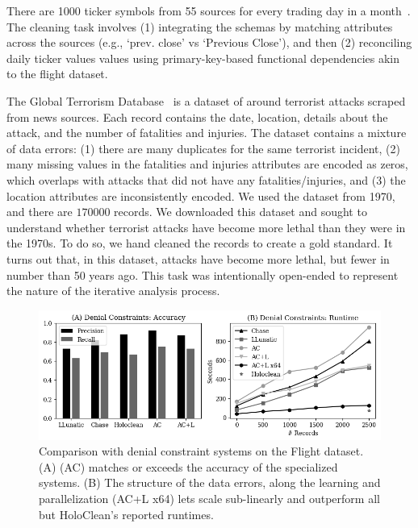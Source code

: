 
 There are 1000 ticker symbols from 55 sources for every trading day in a month~\cite{data-flights}.  The cleaning task involves (1) integrating the schemas by matching attributes across the sources (e.g., `prev. close' vs `Previous Close'), and then (2) reconciling daily ticker values values using primary-key-based functional dependencies akin to the flight dataset.

 The Global Terrorism Database~\cite{data-terrorism} is a dataset of around terrorist attacks scraped from news sources.  Each record contains the date, location, details about the attack, and the number of fatalities and injuries.  The dataset contains a mixture of data errors:
(1) there are many duplicates for the same terrorist incident,
(2) many missing values in the fatalities and injuries attributes are encoded as zeros, which overlaps with attacks that did not have any fatalities/injuries, and
(3) the location attributes are inconsistently encoded.  
We used the dataset from 1970, and there are $170000$ records.  
We downloaded this dataset and sought to understand whether terrorist attacks have become more lethal than they were in the 1970s.  To do so, we hand cleaned the records to create a gold standard.  It turns out that, in this dataset, attacks have become more lethal, but fewer in number than 50 years ago.  This task was intentionally open-ended to represent the nature of the iterative analysis process.



\begin{figure}
    \centering
    \includegraphics[width=\columnwidth]{ac-experiments/exp1.png}
    \caption{\small Comparison with denial constraint systems on the Flight dataset.  (A) \sys (AC) matches or exceeds the accuracy of the specialized systems.  (B) The structure of the data errors, along the learning and parallelization (AC+L x64) lets \sys scale sub-linearly and outperform all but HoloClean's reported runtimes.  \label{exp1a}}
\end{figure}

